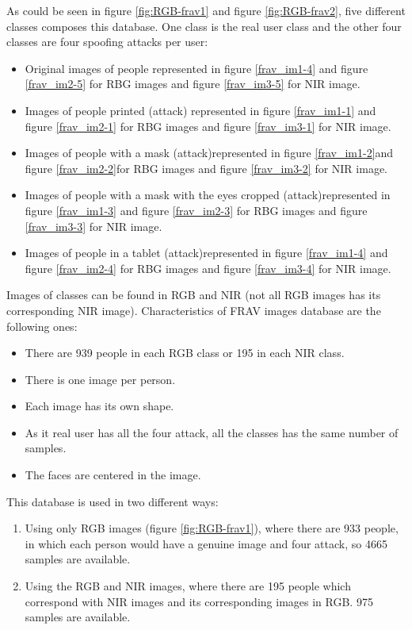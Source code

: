 As could be seen in figure \ref{fig:RGB-frav1} and figure \ref{fig:RGB-frav2}, five different classes composes this database. One class is the real user class and the other four classes are four spoofing attacks per user:

\begin{itemize}
 \item Original images of people represented in figure \ref{frav_im1-4} and figure \ref{frav_im2-5} for RBG images and figure \ref{frav_im3-5} for NIR image.
 \item Images of people printed (attack) represented in figure \ref{frav_im1-1} and figure \ref{frav_im2-1} for RBG images and figure \ref{frav_im3-1} for NIR image.
 \item Images of people with a mask (attack)represented in figure \ref{frav_im1-2}and figure \ref{frav_im2-2}for RBG images and figure \ref{frav_im3-2} for NIR image.
 \item Images of people with a mask with the eyes cropped (attack)represented in figure \ref{frav_im1-3} and figure \ref{frav_im2-3} for RBG images and figure \ref{frav_im3-3} for NIR image.
 \item Images of people in a tablet (attack)represented in figure \ref{frav_im1-4} and figure \ref{frav_im2-4} for RBG images and figure \ref{frav_im3-4} for NIR image.\\
 \end{itemize}

Images of classes can be found in RGB and NIR (not all RGB images has its corresponding NIR image). Characteristics of FRAV images database are the following ones:

\begin{itemize}[noitemsep,topsep=8pt,parsep=0pt,partopsep=20pt]
\item There are 939 people in each RGB class or 195 in each NIR class.
\item There is one image per person.
\item Each image has its own shape.
\item As it real user has all the four attack, all the classes has the same number of samples.
\item The faces are centered in the image.
\end{itemize}

This database is used in two different ways:

\begin{enumerate}
  \item Using only RGB images (figure \ref{fig:RGB-frav1}), where there are 933 people, in which each person would have a genuine image and four attack, so 4665 samples are available.
  \item Using the RGB and NIR images, where there are 195 people which correspond with NIR images and its corresponding images in RGB. 975 samples are available.
\end{enumerate}

